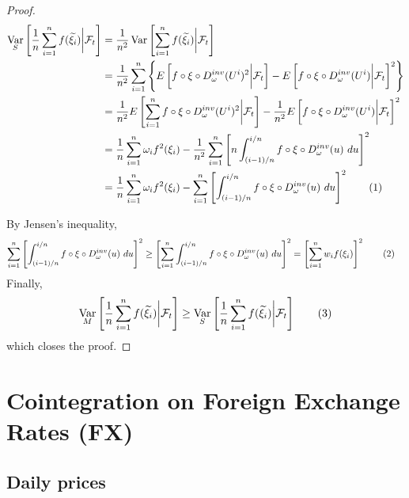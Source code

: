 \documentclass[11pt,a4,twosided,singlespacing,titlepagenumber=on]{scrreprt}
\numberwithin{equation}{chapter} %
\theoremstyle{remark}
\DeclareMathOperator{\var}{Var}
\newcommand\numberthis{\addtocounter{equation}{1}\tag{\theequation}}
\begin{document}
\begin{proof}
\begin{align*}
\var_S \left[ \frac{1}{n} \sum_{i=1}^n f(\widetilde{\xi_i}) \bigg| \mathcal{F}_t \right] &= \frac{1}{n^2} \var \left[ \sum_{i=1}^n f(\widetilde{\xi_i}) \bigg| \mathcal{F}_t \right] \\
																					  &= \frac{1}{n^2} \sum_{i=1}^n \left\{ E \left[ f \circ \xi \circ D_\omega^{inv}(U^i)^2 \bigg| \mathcal{F}_t \right] - E \left[ f \circ \xi \circ D_\omega^{inv}(U^i) \bigg| \mathcal{F}_t \right]^2 \right\}\\
																					  &= \frac{1}{n^2} E \left[ \sum_{i=1}^n f \circ \xi \circ D_\omega^{inv}(U^i)^2 \bigg| \mathcal{F}_t \right] - \frac{1}{n^2} E \left[ f \circ \xi \circ D_\omega^{inv}(U^i) \bigg| \mathcal{F}_t \right]^2 \\
																					  &= \frac{1}{n} \sum_{i=1}^n \omega_i f^2(\xi_i) - \frac{1}{n^2} \sum_{i=1}^n \left[ n \int_{(i-1)/n}^{i/n} f \circ \xi \circ D_\omega^{inv}(u)\text{ }du\right]^2 \\
																					  &= \frac{1}{n} \sum_{i=1}^n \omega_i f^2(\xi_i) - \sum_{i=1}^n \left[ \int_{(i-1)/n}^{i/n} f \circ \xi \circ D_\omega^{inv}(u)\text{ }du\right]^2 \numberthis
\end{align*}

By Jensen's inequality,
\begin{align*}
\sum_{i=1}^n \left[ \int_{(i-1)/n}^{i/n} f \circ \xi \circ D_\omega^{inv}(u)\text{ }du\right]^2 &\geq \left[\sum_{i=1}^n \int_{(i-1)/n}^{i/n} f \circ \xi \circ D_\omega^{inv}(u)\text{ }du\right]^2 = \left[ \sum_{i=1}^n w_i f(\xi_i)\right]^2 \numberthis
\end{align*}
Finally,
\begin{equation}
\var_M \left[ \frac{1}{n} \sum_{i=1}^n f(\widetilde{\xi_i}) \bigg| \mathcal{F}_t \right] \geq \var_S \left[ \frac{1}{n} \sum_{i=1}^n f(\widetilde{\xi_i}) \bigg| \mathcal{F}_t \right] \numberthis
\end{equation}
which closes the proof.
\end{proof}

\section{Cointegration on Foreign Exchange Rates (FX)}

\subsection{Daily prices}
\end{document}
